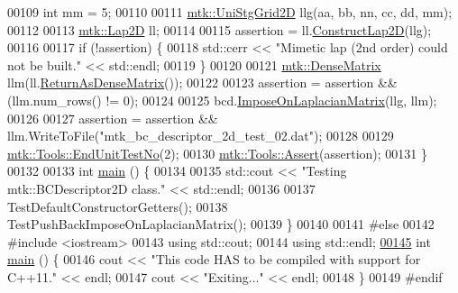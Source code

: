 \begin{DoxyCode}
00109   \textcolor{keywordtype}{int} mm = 5;
00110 
00111   \hyperlink{classmtk_1_1UniStgGrid2D}{mtk::UniStgGrid2D} llg(aa, bb, nn, cc, dd, mm);
00112 
00113   \hyperlink{classmtk_1_1Lap2D}{mtk::Lap2D} ll;
00114 
00115   assertion = ll.\hyperlink{classmtk_1_1Lap2D_a188ee8fee643463affca7de2884711b1}{ConstructLap2D}(llg);
00116 
00117   \textcolor{keywordflow}{if} (!assertion) \{
00118     std::cerr << \textcolor{stringliteral}{"Mimetic lap (2nd order) could not be built."} << std::endl;
00119   \}
00120 
00121   \hyperlink{classmtk_1_1DenseMatrix}{mtk::DenseMatrix} llm(ll.\hyperlink{classmtk_1_1Lap2D_aaac0a22eaa2f036869b24fd420ce5761}{ReturnAsDenseMatrix}());
00122 
00123   assertion = assertion && (llm.num\_rows() != 0);
00124 
00125   bcd.\hyperlink{classmtk_1_1BCDescriptor2D_abade249fa28783a5383a7c2aaf570ea9}{ImposeOnLaplacianMatrix}(llg, llm);
00126 
00127   assertion = assertion && llm.WriteToFile(\textcolor{stringliteral}{"mtk\_bc\_descriptor\_2d\_test\_02.dat"});
00128 
00129   \hyperlink{classmtk_1_1Tools_aba67d9dc35c9c1c49430fcc9ea035e03}{mtk::Tools::EndUnitTestNo}(2);
00130   \hyperlink{classmtk_1_1Tools_ac6804df469c94ab6a796fb64f1e44a89}{mtk::Tools::Assert}(assertion);
00131 \}
00132 
00133 \textcolor{keywordtype}{int} \hyperlink{mtk__bc__descriptor__2d__test_8cc_ae66f6b31b5ad750f1fe042a706a4e3d4}{main} () \{
00134 
00135   std::cout << \textcolor{stringliteral}{"Testing mtk::BCDescriptor2D class."} << std::endl;
00136 
00137   TestDefaultConstructorGetters();
00138   TestPushBackImposeOnLaplacianMatrix();
00139 \}
00140 
00141 \textcolor{preprocessor}{#else}
00142 \textcolor{preprocessor}{#include <iostream>}
00143 \textcolor{keyword}{using} std::cout;
00144 \textcolor{keyword}{using} std::endl;
\hypertarget{mtk__bc__descriptor__2d__test_8cc_source_l00145}{}\hyperlink{mtk__bc__descriptor__2d__test_8cc_ae66f6b31b5ad750f1fe042a706a4e3d4}{00145} \textcolor{keywordtype}{int} \hyperlink{mtk__bc__descriptor__2d__test_8cc_ae66f6b31b5ad750f1fe042a706a4e3d4}{main} () \{
00146   cout << \textcolor{stringliteral}{"This code HAS to be compiled with support for C++11."} << endl;
00147   cout << \textcolor{stringliteral}{"Exiting..."} << endl;
00148 \}
00149 \textcolor{preprocessor}{#endif}
\end{DoxyCode}
